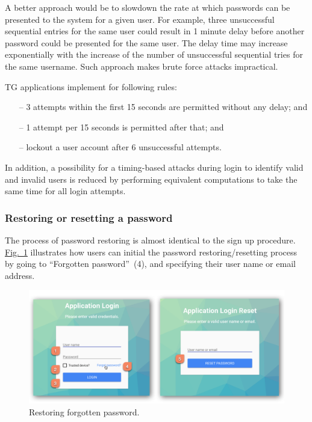 \documentclass[a4paper,12pt,oneside,openright]{memoir}
\begin{document}
	A better approach would be to slowdown the rate at which passwords can be presented to the system for a given user.
	For example, three unsuccessful sequential entries for the same user could result in 1 minute delay before another password could be presented for the same user.
	The delay time may increase exponentially with the increase of the number of unsuccessful sequential tries for the same username.
	Such approach makes brute force attacks impractical.

	TG applications implement for following rules:
	\begin{itemize}
	\item[--] 3 attempts within the first 15 seconds are permitted without any delay; and
	\item[--] 1 attempt per 15 seconds is permitted after that; and
	\item[--] lockout a user account after 6 unsuccessful attempts.
	\end{itemize}

	In addition, a possibility for a timing-based attacks during login to identify valid and invalid users is reduced by performing equivalent computations to take the same time for all login attempts.

\subsubsection*{Restoring or resetting a password}
	The process of password restoring is almost identical to the sign up procedure.
	\hyperref[sec:02:fig:3]{Fig.~\ref*{sec:02:fig:3}} illustrates how users can initial the password restoring/resetting process by going to ``Forgotten password''~(4), and specifying their user name or email address.

	\begin{figure}[h!tbp]
	\centering
	\includegraphics[width=1\linewidth]{images/04-login-or-forgotten-password.png}
	\caption{Restoring forgotten password.}\label{sec:02:fig:3}
	\end{figure}
\end{document}
